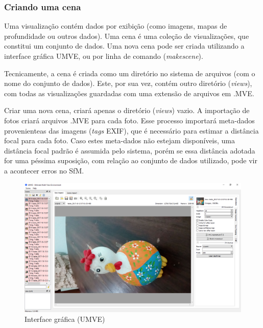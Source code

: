 \subsubsection*{Criando uma cena}

Uma visualização contém dados por exibição (como imagens, mapas de profundidade ou outros dados). Uma cena é uma coleção de visualizações, que constitui um conjunto de dados. Uma nova cena pode ser criada utilizando a interface gráfica UMVE, ou por linha de comando (\emph{makescene}). 

Tecnicamente, a cena é criada como um diretório no sistema de arquivos (com o nome do conjunto de dados). Este, por sua vez, contém outro diretório (\emph{views}), com todas as visualizações guardadas com uma extensão de arquivos em .MVE.

Criar uma nova cena, criará apenas o diretório (\emph{views}) vazio. A importação de fotos criará arquivos .MVE para cada foto. Esse processo importará meta-dados provenienteas das imagens (\emph{tags} EXIF), que é necessário para estimar a distância focal para cada foto. Caso estes meta-dados não estejam disponíveis, uma distância focal padrão é assumida pelo sistema, porém se essa distância adotada for uma péssima suposição, com relação ao conjunto de dados utilizado, pode vir a acontecer erros no SfM.

\begin{figure}[!h]
	\centering
	\includegraphics[width=0.7\linewidth]{figs/umve1.png}
	\caption{%
	Interface gráfica (UMVE)%
	}\label{fig:mvesfm}
\end{figure}
